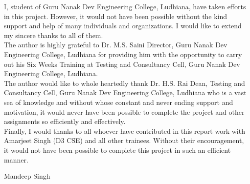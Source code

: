 \begin{Large}
\end{Large}

I, student of Guru Nanak Dev Engineering College, Ludhiana, have taken efforts in this project.
However, it would not have been possible without the kind support and help of many individuals
and organizations. I would like to extend my sincere thanks to all of them.\\

The author is highly grateful to Dr. M.S. Saini Director, Guru Nanak Dev Engineering College, Ludhiana for providing him with the opportunity to carry out his Six Weeks Training at
Testing and Consultancy Cell, Guru Nanak Dev Engineering College, Ludhiana.\\

The author would like to whole heartedly thank Dr. H.S. Rai Dean, Testing and Consultancy
Cell, Guru Nanak Dev Engineering College, Ludhiana who is a vast sea of knowledge and without whose constant and never ending support and motivation, it would never have been possible to complete the project and other assignments so efficiently and effectively.\\

Finally, I would thanks to all whoever have contributed in
this report work with Amarjeet Singh (D3 CSE) and all other trainees. Without their 
encouragement, it would not have been possible to complete this project
in such an efficient manner.





\vskip 1.0cm 
\noindent Mandeep Singh 
